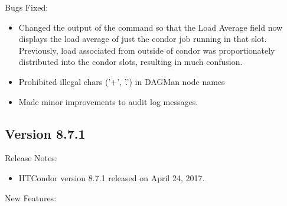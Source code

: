\noindent Bugs Fixed:

\begin{itemize}

\item Changed the output of the  command so that the Load Average
field now displays the load average of just the condor job running in that
slot.  Previously, load associated from outside of condor was proportionately
distributed into the condor slots, resulting in much confusion.

\item Prohibited illegal chars ('+', '.') in DAGMan node names

\item Made minor improvements to audit log messages.

\end{itemize}

\subsection*{\label{sec:New-8-7-1}Version 8.7.1}

\noindent Release Notes:

\begin{itemize}

\item HTCondor version 8.7.1 released on April 24, 2017.

\end{itemize}


\noindent New Features:

